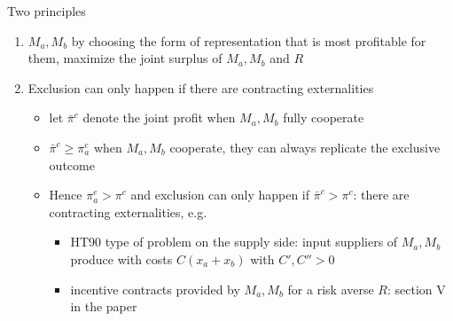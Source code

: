 \documentclass[11pt,english]{beamer}
\begin{document}
\begin{frame}[allowframebreaks]{Two principles}
  \begin{enumerate}
  \item $M_a,M_b$ by choosing the form of representation that is most
    profitable for them, maximize the joint surplus of $M_a,M_b$ and $R$
  \item Exclusion can only happen if there are contracting externalities
    \begin{itemize}
    \item let $\bar{\pi}^c$ denote the joint profit when $M_a,M_b$ fully
      cooperate
    \item $\bar{\pi}^c \geq \pi_a^e$ when $M_a,M_b$ cooperate, they
      can always replicate the exclusive outcome
    \item Hence $\pi^e_a>\pi^c$ and exclusion can only happen if
      $\bar{\pi}^c > \pi^c$: there are contracting externalities, e.g.
      \begin{itemize}
      \item HT90 type of problem on the supply side: input suppliers
        of $M_a,M_b$ produce with costs $C(x_a+x_b)$ with $C',C''>0$
      \item incentive contracts provided by $M_a,M_b$ for a risk
        averse $R$: section V in the paper
      \end{itemize}
    \end{itemize}
  \end{enumerate}
\end{frame}
\end{document}
